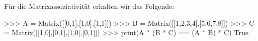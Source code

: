 \section{}



Für die Matrixassoziativität erhalten wir das Folgende:

\begin{consoleoutput}
    >>> A = Matrix([[0,1],[1,0],[1,1]])
    >>> B = Matrix([[1,2,3,4],[5,6,7,8]])
    >>> C = Matrix([[1,0],[0,1],[1,0],[0,1]])
    >>> print(A * (B * C) == (A * B) * C)
    True
\end{consoleoutput}




